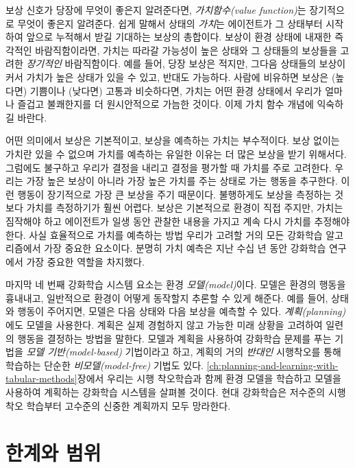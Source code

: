 보상 신호가 당장에 무엇이 좋은지 알려준다면, \emph{가치함수(value function)}는
장기적으로 무엇이 좋은지 알려준다. 쉽게 말해서 상태의 \emph{가치}는 에이전트가
그 상태부터 시작하여 앞으로 누적해서 받길 기대하는 보상의 총합이다. 보상이 환경
상태에 내재한 즉각적인 바람직함이라면, 가치는 따라갈 가능성이 높은 상태와 그
상태들의 보상들을 고려한 \emph{장기적인} 바람직함이다. 예를 들어, 당장 보상은
적지만, 그다음 상태들의 보상이 커서 가치가 높은 상태가 있을 수 있고, 반대도
가능하다. 사람에 비유하면 보상은 (높다면) 기쁨이나 (낮다면) 고통과 비슷하다면,
가치는 어떤 환경 상태에서 우리가 얼마나 즐겁고 불쾌한지를 더 원시안적으로 가늠한
것이다. 이제 가치 함수 개념에 익숙하길 바란다.

어떤 의미에서 보상은 기본적이고, 보상을 예측하는 가치는 부수적이다. 보상 없이는
가치란 있을 수 없으며 가치를 예측하는 유일한 이유는 더 많은 보상을 받기
위해서다. 그럼에도 불구하고 우리가 결정을 내리고 결정을 평가할 때 가치를 주로
고려한다. 우리는 가장 높은 보상이 아니라 가장 높은 가치를 주는 상태로 가는
행동을 추구한다. 이런 행동이 장기적으로 가장 큰 보상을 주기 때문이다. 불행하게도
보상을 측정하는 것보다 가치를 측정하기가 훨씬 어렵다. 보상은 기본적으로 환경이
직접 주지만, 가치는 짐작해야 하고 에이전트가 일생 동안 관찰한 내용을 가지고 계속
다시 가치를 추정해야 한다. 사실 효율적으로 가치를 예측하는 방법 우리가 고려할
거의 모든 강화학습 알고리즘에서 가장 중요한 요소이다. 분명히 가치 예측은 지난
수십 년 동안 강화학습 연구에서 가장 중요한 역할을 차지했다.

마지막 네 번째 강화학습 시스템 요소는 환경 \emph{모델(model)}이다. 모델은 환경의
행동을 흉내내고, 일반적으로 환경이 어떻게 동작할지 추론할 수 있게 해준다. 예를
들어, 상태와 행동이 주어지면, 모델은 다음 상태와 다음 보상을 예측할 수 있다.
\emph{계획(planning)}에도 모델을 사용한다. 계획은 실제 경험하지 않고 가능한 미래
상황을 고려하여 일련의 행동을 결정하는 방법을 말한다. 모델과 계획을 사용하여
강화학습 문제를 푸는 기법을 \emph{모델 기반(model-based)} 기법이라고 하고,
계획의 거의 \emph{반대인} 시행착오를 통해 학습하는 단순한
\emph{비모델(model-free)} 기법도 있다.
\ref{ch:planning-and-learning-with-tabular-methods}장에서 우리는 시행 착오학습과
함께 환경 모델을 학습하고 모델을 사용하여 계획하는 강화학습 시스템을 살펴볼
것이다. 현대 강화학습은 저수준의 시행착오 학습부터 고수준의 신중한 계획까지 모두
망라한다.


\section{한계와 범위}

